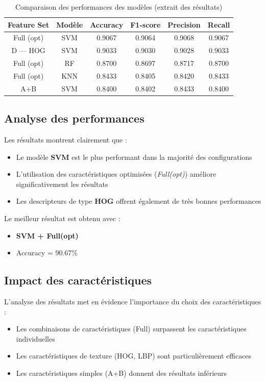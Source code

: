 \documentclass[12pt,a4paper]{article}
\begin{document}
    \begin{table}[ht]
    \centering
    \caption{Comparaison des performances des modèles (extrait des résultats)}
    \begin{tabular}{|c|c|c|c|c|c|}
    \hline
    Feature Set & Modèle & Accuracy & F1-score & Precision & Recall \\
    \hline
    Full (opt) & SVM & 0.9067 & 0.9064 & 0.9068 & 0.9067 \\
    \hline
    D — HOG & SVM & 0.9033 & 0.9030 & 0.9028 & 0.9033 \\
    \hline
    Full (opt) & RF & 0.8700 & 0.8697 & 0.8717 & 0.8700 \\
    \hline
    Full (opt) & KNN & 0.8433 & 0.8405 & 0.8420 & 0.8433 \\
    \hline
    A+B & SVM & 0.8400 & 0.8402 & 0.8433 & 0.8400 \\
    \hline
    \end{tabular}
    \end{table}

    \subsection{Analyse des performances}

    Les résultats montrent clairement que :
    \begin{itemize}
        \item Le modèle \textbf{SVM} est le plus performant dans la majorité des configurations
        \item L’utilisation des caractéristiques optimisées (\textit{Full(opt)}) améliore significativement les résultats
        \item Les descripteurs de type \textbf{HOG} offrent également de très bonnes performances
    \end{itemize}

    Le meilleur résultat est obtenu avec :
    \begin{itemize}
        \item \textbf{SVM + Full(opt)}
        \item Accuracy = 90.67\%
    \end{itemize}

    \subsection{Impact des caractéristiques}

    L’analyse des résultats met en évidence l’importance du choix des caractéristiques :
    \begin{itemize}
        \item Les combinaisons de caractéristiques (Full) surpassent les caractéristiques individuelles
        \item Les caractéristiques de texture (HOG, LBP) sont particulièrement efficaces
        \item Les caractéristiques simples (A+B) donnent des résultats inférieurs
    \end{itemize}
\end{document}
